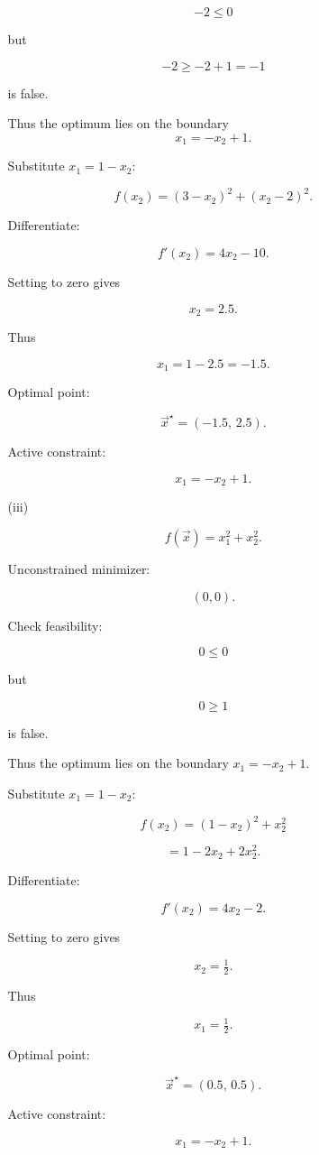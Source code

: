 \documentclass[
  12pt,
]{fphw}
\begin{document}
\begin{enumerate}
\begin{enumerate}
\[
-2 \le0
\]

but

\[
-2 \ge -2+1=-1
\]

is false.

Thus the optimum lies on the boundary
\[
x_1 = -x_2+1.
\]

Substitute $x_1=1-x_2$:

\[
f(x_2) = (3-x_2)^2 + (x_2-2)^2.
\]

Differentiate:

\[
f'(x_2)=4x_2-10.
\]

Setting to zero gives

\[
x_2=2.5.
\]

Thus

\[
x_1 = 1-2.5 = -1.5.
\]

\medskip
Optimal point:

\[
\vec{x}^\star=(-1.5,\,2.5).
\]

Active constraint:

\[
x_1=-x_2+1.
\]

\bigskip

\item[(iii)]

\[
f(\vec{x}) = x_1^2 + x_2^2.
\]

Unconstrained minimizer:

\[
(0,0).
\]

Check feasibility:

\[
0 \le 0
\]

but

\[
0 \ge 1
\]

is false.

Thus the optimum lies on the boundary $x_1=-x_2+1$.

Substitute $x_1=1-x_2$:

\[
f(x_2)=(1-x_2)^2+x_2^2
\]

\[
=1-2x_2+2x_2^2.
\]

Differentiate:

\[
f'(x_2)=4x_2-2.
\]

Setting to zero gives

\[
x_2=\tfrac12.
\]

Thus

\[
x_1=\tfrac12.
\]

\medskip
Optimal point:

\[
\vec{x}^\star=(0.5,\,0.5).
\]

Active constraint:

\[
x_1=-x_2+1.
\]

\end{enumerate}

\end{enumerate}
\end{document}
